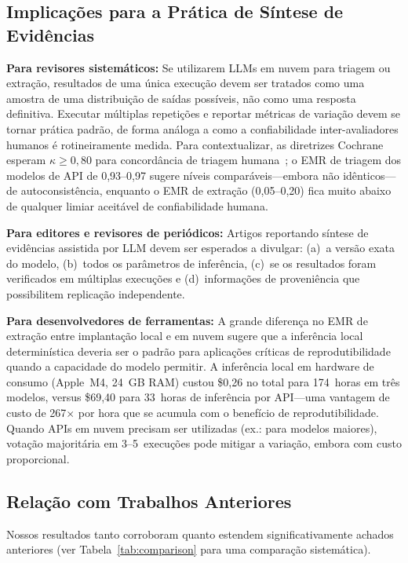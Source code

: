 \documentclass[12pt, a4paper]{article}
\begin{document}
\subsection{Implicações para a Prática de Síntese de Evidências}

\textbf{Para revisores sistemáticos:}
Se utilizarem LLMs em nuvem para triagem ou extração, resultados de uma única execução devem ser tratados como uma amostra de uma distribuição de saídas possíveis, não como uma resposta definitiva.
Executar múltiplas repetições e reportar métricas de variação devem se tornar prática padrão, de forma análoga a como a confiabilidade inter-avaliadores humanos é rotineiramente medida.
Para contextualizar, as diretrizes Cochrane esperam $\kappa{\geq}0,80$ para concordância de triagem humana~\citep{higgins2019cochrane}; o EMR de triagem dos modelos de API de 0,93--0,97 sugere níveis comparáveis---embora não idênticos---de autoconsistência, enquanto o EMR de extração (0,05--0,20) fica muito abaixo de qualquer limiar aceitável de confiabilidade humana.

\textbf{Para editores e revisores de periódicos:}
Artigos reportando síntese de evidências assistida por LLM devem ser esperados a divulgar: (a)~a versão exata do modelo, (b)~todos os parâmetros de inferência, (c)~se os resultados foram verificados em múltiplas execuções e (d)~informações de proveniência que possibilitem replicação independente.

\textbf{Para desenvolvedores de ferramentas:}
A grande diferença no EMR de extração entre implantação local e em nuvem sugere que a inferência local determinística deveria ser o padrão para aplicações críticas de reprodutibilidade quando a capacidade do modelo permitir.
A inferência local em hardware de consumo (Apple~M4, 24~GB RAM) custou \$0,26 no total para 174~horas em três modelos, versus \$69,40 para 33~horas de inferência por API---uma vantagem de custo de 267$\times$ por hora que se acumula com o benefício de reprodutibilidade.
Quando APIs em nuvem precisam ser utilizadas (ex.: para modelos maiores), votação majoritária em 3--5~execuções pode mitigar a variação, embora com custo proporcional.

\subsection{Relação com Trabalhos Anteriores}

Nossos resultados tanto corroboram quanto estendem significativamente achados anteriores (ver Tabela~\ref{tab:comparison} para uma comparação sistemática).
\end{document}
